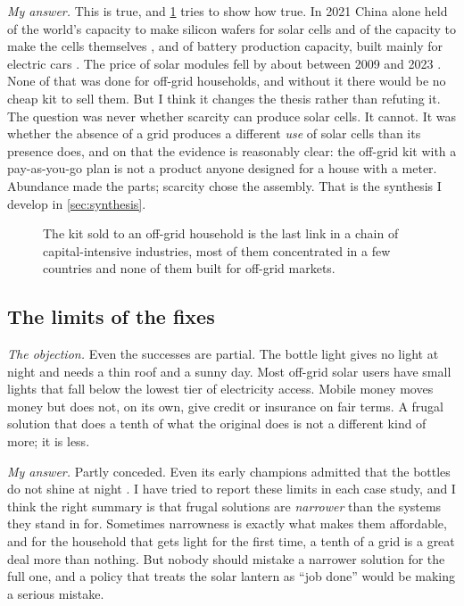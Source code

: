 \emph{My answer.} This is true, and \cref{fig:hidden-abundance} tries to show
how true. In 2021 China alone held \pvWaferShare{} of the world's capacity to
make silicon wafers for solar cells and \pvCellShare{} of the capacity to make
the cells themselves \parencite{iea2022pv}, and \batteryCapacityShare{} of
battery production capacity, built mainly for electric cars
\parencite{iea2022evbatt}. The price of solar modules fell by about
\moduleCostFall{} between 2009 and 2023 \parencite{irena2024costs}. None of
that was done for off-grid households, and without it there would be no cheap
kit to sell them. But I think it changes the thesis rather than
refuting it. The question was never whether scarcity can produce solar cells.
It cannot. It was whether the absence of a grid produces a different
\emph{use} of solar cells than its presence does, and on that the evidence is
reasonably clear: the off-grid kit with a pay-as-you-go plan is not a product
anyone designed for a house with a meter. Abundance made the parts; scarcity
chose the assembly. That is the synthesis I develop in
\cref{sec:synthesis}.

\begin{figure}[htbp]
\centering

\caption{ The kit sold to an off-grid household is the last link in a chain
of capital-intensive industries, most of them concentrated in a few countries
and none of them built for off-grid markets.
}
\label{fig:hidden-abundance}
\end{figure}

\subsection{The limits of the fixes}

\emph{The objection.} Even the successes are partial. The bottle light gives
no light at night and needs a thin roof and a sunny day. Most off-grid solar
users have small lights that fall below the lowest tier of electricity access.
Mobile money moves money but does not, on its own, give credit or insurance on
fair terms. A frugal solution that does a tenth of what the original does is
not a different kind of more; it is less.

\emph{My answer.} Partly conceded. Even its early champions admitted that the
bottles do not shine at night \parencite{npr2011literoflight}. I have tried to report these
limits in each case study, and I think the right summary is that frugal
solutions are \emph{narrower} than the systems they stand in for. Sometimes
narrowness is exactly what makes them affordable, and for the household that
gets light for the first time, a tenth of a grid is a great deal more than
nothing. But nobody should mistake a narrower solution for the full one, and a
policy that treats the solar lantern as ``job done'' would be making a serious
mistake.

